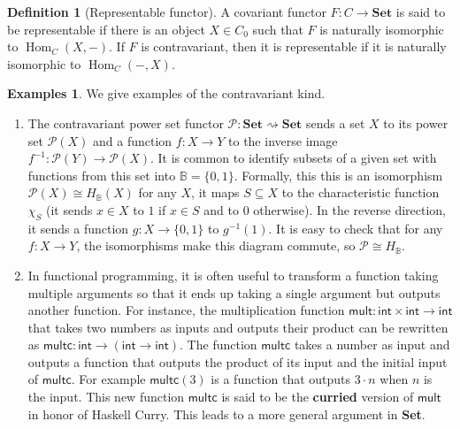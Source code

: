 \documentclass{article}
\theoremstyle{definition}
\newtheorem{defn}[thm]{Definition}
\newtheorem{exmps}[thm]{Examples}
\theoremstyle{remark}
\newcommand{\mP}{\mathcal{P}}
\DeclareMathOperator{\Hom}{Hom}
\begin{document}
\begin{defn}[Representable functor]
	 A covariant functor $F: C\rightarrow \textbf{Set}$ is said to be representable if there is an object $X \in C_0$ such that $F$ is naturally isomorphic to $\Hom_C(X,-)$. If $F$ is contravariant, then it is representable if it is naturally isomorphic to $\Hom_C(-,X)$.
\end{defn}
\begin{exmps}
	We give examples of the contravariant kind.
	\begin{enumerate}
		\item The contravariant power set functor $\mP: \textbf{Set} \rightsquigarrow \textbf{Set}$ sends a set $X$ to its power set $\mP(X)$ and a function $f:X\rightarrow Y$ to the inverse image $f^{-1}:\mP(Y) \rightarrow \mP(X)$. It is common to identify subsets of a given set with functions from this set into $\mathbb{B} = \{0,1\}$. Formally, this this is an isomorphism $\mP(X) \cong H_{\mathbb{B}}(X)$ for any $X$, it maps $S \subseteq X$ to the characteristic function $\chi_S$ (it sends $x \in X$ to $1$ if $x \in S$ and to $0$ otherwise). In the reverse direction, it sends a function $g:X\rightarrow \{0,1\}$ to $g^{-1}(1)$. It is easy to check that for any $f:X\rightarrow Y$, the isomorphisms make this diagram commute, so $\mP \cong H_{\mathbb{B}}$.
		\begin{figure}[h]
			\centering
		\end{figure}
		\item In functional programming, it is often useful to transform a function taking multiple arguments so that it ends up taking a single argument but outputs another function. For instance, the multiplication function $\textsf{mult}: \textsf{int} \times \textsf{int} \rightarrow \textsf{int}$ that takes two numbers as inputs and outputs their product can be rewritten as $\textsf{multc} : \textsf{int} \rightarrow (\textsf{int} \rightarrow \textsf{int})$. The function $\textsf{multc}$ takes a number as input and outputs a function that outputs the product of its input and the initial input of $\textsf{multc}$. For example $\textsf{multc}(3)$ is a function that outputs $3\cdot n$ when $n$ is the input. This new function $\textsf{multc}$ is said to be the \textbf{curried} version of $\textsf{mult}$ in honor of Haskell Curry. This leads to a more general argument in \textbf{Set}.
		

\end{enumerate}
\end{exmps}
\end{document}
